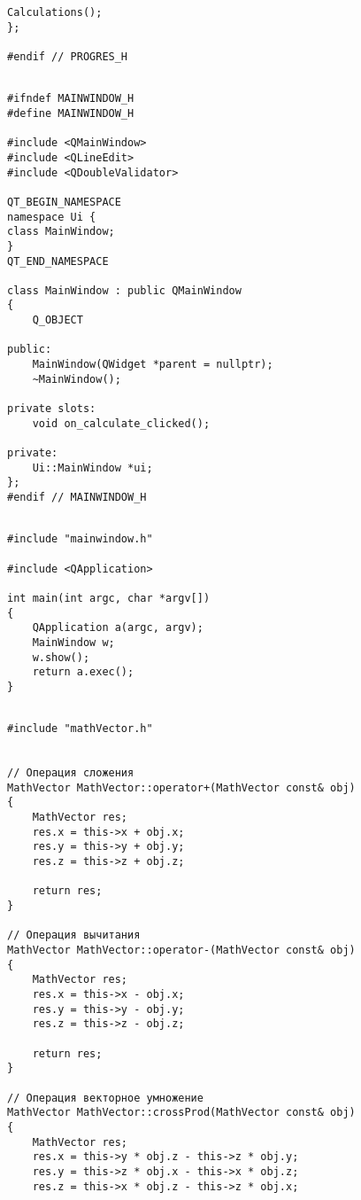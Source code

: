 \begin{landscape}
\begin{lstlisting}[caption={progRes.h}]
    Calculations();
};

#endif // PROGRES_H

\end{lstlisting}

\newpage
\begin{lstlisting}[caption={mainwindow.h}]

#ifndef MAINWINDOW_H
#define MAINWINDOW_H

#include <QMainWindow>
#include <QLineEdit>
#include <QDoubleValidator>

QT_BEGIN_NAMESPACE
namespace Ui {
class MainWindow;
}
QT_END_NAMESPACE

class MainWindow : public QMainWindow
{
    Q_OBJECT

public:
    MainWindow(QWidget *parent = nullptr);
    ~MainWindow();

private slots:
    void on_calculate_clicked();

private:
    Ui::MainWindow *ui;
};
#endif // MAINWINDOW_H

\end{lstlisting}

\newpage
\begin{lstlisting}[caption={main.cpp}]

#include "mainwindow.h"

#include <QApplication>

int main(int argc, char *argv[])
{
    QApplication a(argc, argv);
    MainWindow w;
    w.show();
    return a.exec();
}

\end{lstlisting}

\newpage
\begin{lstlisting}[caption={mathVector.cpp}]

#include "mathVector.h"


// Операция сложения
MathVector MathVector::operator+(MathVector const& obj)
{
    MathVector res;
    res.x = this->x + obj.x;
    res.y = this->y + obj.y;
    res.z = this->z + obj.z;

    return res;
}

// Операция вычитания
MathVector MathVector::operator-(MathVector const& obj)
{
    MathVector res;
    res.x = this->x - obj.x;
    res.y = this->y - obj.y;
    res.z = this->z - obj.z;

    return res;
}

// Операция векторное умножение
MathVector MathVector::crossProd(MathVector const& obj)
{
    MathVector res;
    res.x = this->y * obj.z - this->z * obj.y;
    res.y = this->z * obj.x - this->x * obj.z;
    res.z = this->x * obj.z - this->z * obj.x;


\end{lstlisting}
\end{landscape}
